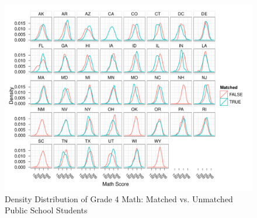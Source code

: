 \documentclass[letterpaper,12p,twoside]{article} %
\begin{document}
\begin{figure}[h]
\begin{center}
\includegraphics[height=\textwidth,angle=90]{../Figures/g4mathlrPublicDensity.pdf}
\caption{Density Distribution of Grade 4 Math: Matched vs. Unmatched Public School Students}
\label{fig:g4reading:publicdensity}
\end{center}
\end{figure}
\clearpage
\end{document}
